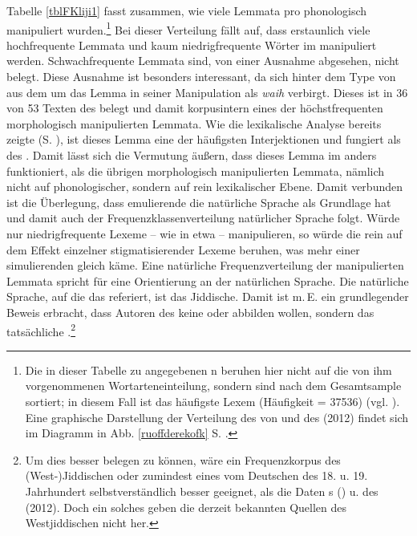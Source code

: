 Tabelle \ref{tblFKliji1} fasst zusammen, wie viele Lemmata pro  phonologisch manipuliert wurden.\footnote{Die in dieser Tabelle zu \textcite{Ruoff1981} angegebenen n beruhen hier nicht auf die von ihm vorgenommenen Wortarteneinteilung, sondern sind nach dem Gesamtsample sortiert; in diesem Fall ist das häufigste Lexem  (Häufigkeit = 37536) (vgl. \cite[514]{Ruoff1981}). Eine graphische Darstellung der Verteilung des  von \textcite{Ruoff1981} und des  (2012) findet sich im Diagramm in Abb. \ref{ruoffderekofk} S. \pageref{ruoffderekofk}.} Bei dieser Verteilung fällt auf, dass erstaunlich viele hochfrequente Lemmata und kaum niedrigfrequente Wörter im  manipuliert werden. Schwachfrequente Lemmata sind, von einer Ausnahme abgesehen, nicht belegt. Diese Ausnahme ist besonders interessant, da sich hinter dem Type von  aus dem  um das Lemma  in seiner Manipulation als \textit{waih} verbirgt. Dieses ist in 36 von 53 Texten des  belegt und damit korpusintern eines der höchstfrequenten morphologisch manipulierten Lemmata. Wie die lexikalische Analyse bereits zeigte (S. \pageref{interjektionen}), ist dieses Lemma eine der häufigsten Interjektionen und fungiert als  des . Damit lässt sich die Vermutung äußern, dass dieses Lemma im  anders funktioniert, als die übrigen morphologisch manipulierten Lemmata, nämlich nicht auf phonologischer, sondern auf rein lexikalischer Ebene. Damit verbunden ist die Überlegung, dass emulierende  die natürliche Sprache als Grundlage hat und damit auch der Frequenzklassenverteilung natürlicher Sprache folgt. Würde  nur niedrigfrequente Lexeme – wie in etwa  – manipulieren, so würde die  rein auf dem Effekt einzelner stigmatisierender Lexeme beruhen, was mehr einer simulierenden  gleich käme. Eine natürliche Frequenzverteilung der manipulierten Lemmata spricht für eine Orientierung an der natürlichen Sprache. Die natürliche Sprache, auf die das  referiert, ist das Jiddische. Damit ist m.\,E. ein grundlegender Beweis erbracht, dass Autoren des  keine  oder  abbilden wollen, sondern das tatsächliche .\footnote{Um dies besser belegen zu können, wäre ein Frequenzkorpus des (West-)Jiddischen oder zumindest eines vom Deutschen des 18. u. 19. Jahrhundert selbstverständlich besser geeignet, als die Daten \citeauthor{Ruoff1981}s (\citeyear{Ruoff1981}) u. des  (2012). Doch ein solches geben die derzeit bekannten Quellen des Westjiddischen nicht her.}

